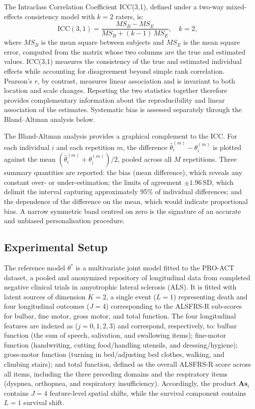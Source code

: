 \documentclass{rapportCS}
\begin{document}
The {Intraclass Correlation Coefficient} ICC(3,1), defined under a two-way mixed-effects consistency model with $k = 2$ raters, is:
\begin{equation}
  \mathrm{ICC}(3,1) = \frac{MS_B - MS_E}{MS_B + (k - 1)\,MS_E}, \quad k = 2,
\end{equation}
where $MS_B$ is the mean square between subjects and $MS_E$ is the mean square error, computed from the matrix whose two columns are the true and estimated values. ICC(3,1) measures the consistency of the true and estimated individual effects while accounting for disagreement beyond simple rank correlation. Pearson's $r$, by contrast, measures linear association and is invariant to both location and scale changes. Reporting the two statistics together therefore provides complementary information about the reproducibility and linear association of the estimates. Systematic bias is assessed separately through the Bland--Altman analysis below.

The {Bland-Altman analysis} provides a graphical complement to the ICC. For each individual $i$ and each repetition $m$, the difference $\hat{\theta}_i^{(m)} - \theta_i^{(m)}$ is plotted against the mean $(\hat{\theta}_i^{(m)} + \theta_i^{(m)})/2$, pooled across all $M$ repetitions. Three summary quantities are reported: the bias (mean difference), which reveals any constant over- or under-estimation; the limits of agreement $\pm 1.96\,\mathrm{SD}$, which delimit the interval capturing approximately 95\% of individual differences; and the dependence of the difference on the mean, which would indicate proportional bias. A narrow symmetric band centred on zero is the signature of an accurate and unbiased personalisation procedure.
 
\subsection{Experimental Setup}

The reference model $\theta^*$ is a multivariate joint model fitted to the PRO-ACT dataset, a pooled and anonymized repository of longitudinal data from completed negative clinical trials in amyotrophic lateral sclerosis (ALS). It is fitted with latent sources of dimension $K = 2$, a single event ($L = 1$) representing death and four longitudinal outcomes ($J=4$) corresponding to the ALSFRS-R sub-scores for bulbar, fine motor, gross motor, and total function. The four longitudinal features are indexed as ($j=0,1,2,3$) and correspond, respectively, to: bulbar function (the sum of speech, salivation, and swallowing items); fine-motor function (handwriting, cutting food/handling utensils, and dressing/hygiene); gross-motor function (turning in bed/adjusting bed clothes, walking, and climbing stairs); and total function, defined as the overall ALSFRS-R score across all items, including the three preceding domains and the respiratory items (dyspnea, orthopnea, and respiratory insufficiency). Accordingly, the product $\mathbf{A}\mathbf{s}_i$ contains $J=4$ feature-level spatial shifts, while the survival component contains $L=1$ survival shift.
\end{document}
